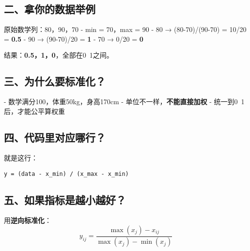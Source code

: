 \documentclass{article}
\begin{document}
\subsection{二、拿你的数据举例}
原始数学列：80，90，70
- min = 70，max = 90
- 80 → (80-70)/(90-70) = 10/20 = \textbf{0.5}
- 90 → (90-70)/20 = \textbf{1}
- 70 → 0/20 = \textbf{0}

结果：\textbf{0.5，1，0}，全部在0~1之间。

\subsection{三、为什么要标准化？}
- 数学满分100，体重50kg，身高170cm
- 单位不一样，\textbf{不能直接加权}
- 统一到0~1后，才能公平算权重

\subsection{四、代码里对应哪行？}
就是这行：
\begin{verbatim}
y = (data - x_min) / (x_max - x_min)
\end{verbatim}

\subsection{五、如果指标是越小越好？}
用\textbf{逆向标准化}：
\[ y_{ij} = \frac{\max(x_j) - x_{ij}}{\max(x_j) - \min(x_j)} \]
\end{document}
